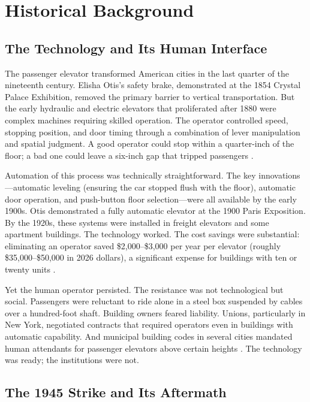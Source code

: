 \documentclass[12pt]{article}
\begin{document}
\section{Historical Background} \label{sec:background}

\subsection{The Technology and Its Human Interface}

The passenger elevator transformed American cities in the last quarter of the nineteenth century. Elisha Otis's safety brake, demonstrated at the 1854 Crystal Palace Exhibition, removed the primary barrier to vertical transportation. But the early hydraulic and electric elevators that proliferated after 1880 were complex machines requiring skilled operation. The operator controlled speed, stopping position, and door timing through a combination of lever manipulation and spatial judgment. A good operator could stop within a quarter-inch of the floor; a bad one could leave a six-inch gap that tripped passengers \citep{goodwin2005}.

Automation of this process was technically straightforward. The key innovations---automatic leveling (ensuring the car stopped flush with the floor), automatic door operation, and push-button floor selection---were all available by the early 1900s. Otis demonstrated a fully automatic elevator at the 1900 Paris Exposition. By the 1920s, these systems were installed in freight elevators and some apartment buildings. The technology worked. The cost savings were substantial: eliminating an operator saved \$2,000--\$3,000 per year per elevator (roughly \$35,000--\$50,000 in 2026 dollars), a significant expense for buildings with ten or twenty units \citep{price2013}.

Yet the human operator persisted. The resistance was not technological but social. Passengers were reluctant to ride alone in a steel box suspended by cables over a hundred-foot shaft. Building owners feared liability. Unions, particularly in New York, negotiated contracts that required operators even in buildings with automatic capability. And municipal building codes in several cities mandated human attendants for passenger elevators above certain heights \citep{bernard2014}. The technology was ready; the institutions were not.

\subsection{The 1945 Strike and Its Aftermath}
\end{document}

